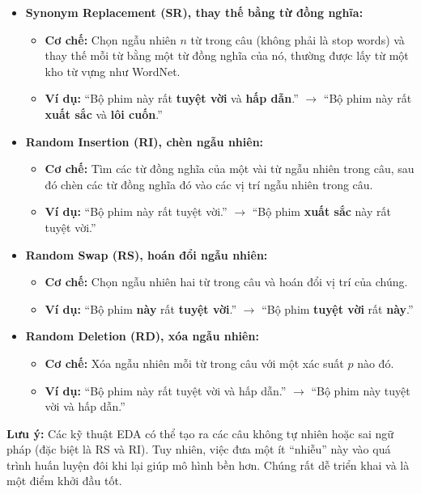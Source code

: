 \begin{itemize}
    \item \textbf{Synonym Replacement (SR), thay thế bằng từ đồng nghĩa:}
        \begin{itemize}
            \item \textbf{Cơ chế:} Chọn ngẫu nhiên $n$ từ trong câu (không phải là stop words) và thay thế mỗi từ bằng một từ đồng nghĩa của nó, thường được lấy từ một kho từ vựng như WordNet.
            \item \textbf{Ví dụ:} “Bộ phim này rất \textbf{tuyệt vời} và \textbf{hấp dẫn}.” $\rightarrow$ “Bộ phim này rất \textbf{xuất sắc} và \textbf{lôi cuốn}.”
        \end{itemize}
    \item \textbf{Random Insertion (RI), chèn ngẫu nhiên:}
        \begin{itemize}
            \item \textbf{Cơ chế:} Tìm các từ đồng nghĩa của một vài từ ngẫu nhiên trong câu, sau đó chèn các từ đồng nghĩa đó vào các vị trí ngẫu nhiên trong câu.
            \item \textbf{Ví dụ:} “Bộ phim này rất tuyệt vời.” $\rightarrow$ “Bộ phim \textbf{xuất sắc} này rất tuyệt vời.”
        \end{itemize}
    \item \textbf{Random Swap (RS), hoán đổi ngẫu nhiên:}
        \begin{itemize}
            \item \textbf{Cơ chế:} Chọn ngẫu nhiên hai từ trong câu và hoán đổi vị trí của chúng.
            \item \textbf{Ví dụ:} “Bộ phim \textbf{này} rất \textbf{tuyệt vời}.” $\rightarrow$ “Bộ phim \textbf{tuyệt vời} rất \textbf{này}.”
        \end{itemize}
    \item \textbf{Random Deletion (RD), xóa ngẫu nhiên:}
        \begin{itemize}
            \item \textbf{Cơ chế:} Xóa ngẫu nhiên mỗi từ trong câu với một xác suất $p$ nào đó.
            \item \textbf{Ví dụ:} “Bộ phim này rất tuyệt vời và hấp dẫn.” $\rightarrow$ “Bộ phim này tuyệt vời và hấp dẫn.”
        \end{itemize}
\end{itemize}
\textbf{Lưu ý:} Các kỹ thuật EDA có thể tạo ra các câu không tự nhiên hoặc sai ngữ pháp (đặc biệt là RS và RI). Tuy nhiên, việc đưa một ít “nhiễu” này vào quá trình huấn luyện đôi khi lại giúp mô hình bền hơn. Chúng rất dễ triển khai và là một điểm khởi đầu tốt.

